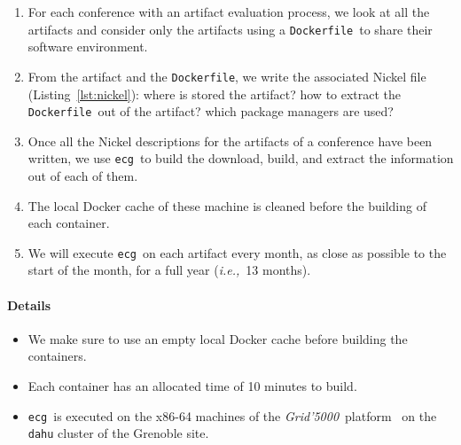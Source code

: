 \documentclass[sigconf,natbib=false]{acmart}
\newcommand{\ie}{\emph{i.e.,}}
\newcommand{\grid}{\emph{Grid'5000}}
\newcommand{\df}{\texttt{Dockerfile}}
\newcommand{\ecg}{\texttt{ecg}}
\newcommand{\todo}[1]{{\color{red}{TODO: #1}}}
\begin{document}
\begin{enumerate}
\item For each conference with an artifact evaluation process, we look at all the artifacts and consider only the artifacts using a \df\ to share their software environment.
\item From the artifact and the \df, we write the associated Nickel file (Listing~\ref{lst:nickel}): where is stored the artifact? how to extract the \df\ out of the artifact? which package managers are used?
\item Once all the Nickel descriptions for the artifacts of a conference have been written, we use \ecg\ to build the download, build, and extract the information out of each of them.
\item The local Docker cache of these machine is cleaned before the building of each container.
\item We will execute \ecg\ on each artifact every month, as close as possible to the start of the month, for a full year (\ie\ 13 months).
\end{enumerate}

\paragraph{Details}

\begin{itemize}
\item We make sure to use an empty local Docker cache before building the containers.
\item Each container has an allocated time of 10 minutes to build.
\item \ecg\ is executed on the x86-64 machines of the \grid\ platform~\cite{grid5000} on the \texttt{dahu} cluster of the Grenoble site.
\end{itemize}



% 
\end{document}
